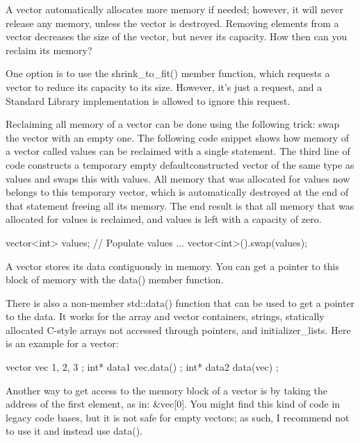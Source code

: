 
A vector automatically allocates more memory if needed; however, it will never release any memory, unless the vector is destroyed. Removing elements from a vector decreases the size of the vector, but never its capacity. How then can you reclaim its memory?

One option is to use the shrink\_to\_fit() member function, which requests a vector to reduce its capacity to its size. However, it’s just a request, and a Standard Library implementation is allowed to ignore this request.

Reclaiming all memory of a vector can be done using the following trick: swap the vector with an empty one. The following code snippet shows how memory of a vector called values can be reclaimed with a single statement. The third line of code constructs a temporary empty defaultconstructed vector of the same type as values and swaps this with values. All memory that was allocated for values now belongs to this temporary vector, which is automatically destroyed at the end of that statement freeing all its memory. The end result is that all memory that was allocated for values is reclaimed, and values is left with a capacity of zero.

\begin{cpp}
vector<int> values;
// Populate values ...
vector<int>().swap(values);
\end{cpp}


A vector stores its data contiguously in memory. You can get a pointer to this block of memory with the data() member function.

There is also a non-member std::data() function that can be used to get a pointer to the data. It works for the array and vector containers, strings, statically allocated C-style arrays not accessed through pointers, and initializer\_lists. Here is an example for a vector:

\begin{cpp}
vector vec { 1, 2, 3 };
int* data1 { vec.data() };
int* data2 { data(vec) };
\end{cpp}

Another way to get access to the memory block of a vector is by taking the address of the first element, as in: \&vec[0]. You might find this kind of code in legacy code bases, but it is not safe for empty vectors; as such, I recommend not to use it and instead use data().

